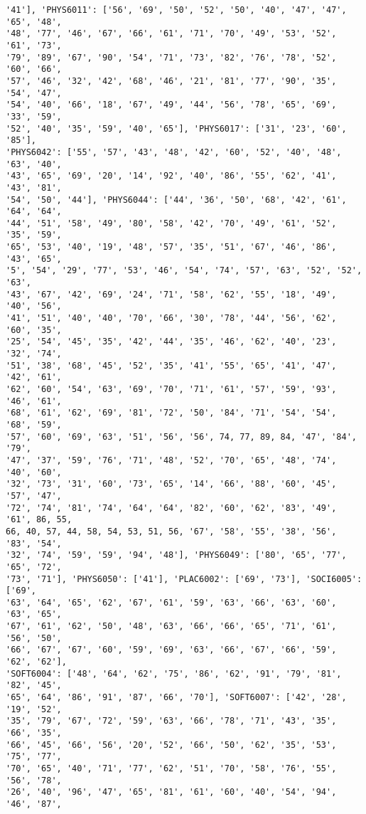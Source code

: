 \documentclass[11pt]{article}
\begin{document}
\begin{Verbatim}[commandchars=\\\{\}]
'41'], 'PHYS6011': ['56', '69', '50', '52', '50', '40', '47', '47', '65', '48',
'48', '77', '46', '67', '66', '61', '71', '70', '49', '53', '52', '61', '73',
'79', '89', '67', '90', '54', '71', '73', '82', '76', '78', '52', '60', '66',
'57', '46', '32', '42', '68', '46', '21', '81', '77', '90', '35', '54', '47',
'54', '40', '66', '18', '67', '49', '44', '56', '78', '65', '69', '33', '59',
'52', '40', '35', '59', '40', '65'], 'PHYS6017': ['31', '23', '60', '85'],
'PHYS6042': ['55', '57', '43', '48', '42', '60', '52', '40', '48', '63', '40',
'43', '65', '69', '20', '14', '92', '40', '86', '55', '62', '41', '43', '81',
'54', '50', '44'], 'PHYS6044': ['44', '36', '50', '68', '42', '61', '64', '64',
'44', '51', '58', '49', '80', '58', '42', '70', '49', '61', '52', '35', '59',
'65', '53', '40', '19', '48', '57', '35', '51', '67', '46', '86', '43', '65',
'5', '54', '29', '77', '53', '46', '54', '74', '57', '63', '52', '52', '63',
'43', '67', '42', '69', '24', '71', '58', '62', '55', '18', '49', '40', '56',
'41', '51', '40', '40', '70', '66', '30', '78', '44', '56', '62', '60', '35',
'25', '54', '45', '35', '42', '44', '35', '46', '62', '40', '23', '32', '74',
'51', '38', '68', '45', '52', '35', '41', '55', '65', '41', '47', '42', '61',
'62', '60', '54', '63', '69', '70', '71', '61', '57', '59', '93', '46', '61',
'68', '61', '62', '69', '81', '72', '50', '84', '71', '54', '54', '68', '59',
'57', '60', '69', '63', '51', '56', '56', 74, 77, 89, 84, '47', '84', '79',
'47', '37', '59', '76', '71', '48', '52', '70', '65', '48', '74', '40', '60',
'32', '73', '31', '60', '73', '65', '14', '66', '88', '60', '45', '57', '47',
'72', '74', '81', '74', '64', '64', '82', '60', '62', '83', '49', '61', 86, 55,
66, 40, 57, 44, 58, 54, 53, 51, 56, '67', '58', '55', '38', '56', '83', '54',
'32', '74', '59', '59', '94', '48'], 'PHYS6049': ['80', '65', '77', '65', '72',
'73', '71'], 'PHYS6050': ['41'], 'PLAC6002': ['69', '73'], 'SOCI6005': ['69',
'63', '64', '65', '62', '67', '61', '59', '63', '66', '63', '60', '63', '65',
'67', '61', '62', '50', '48', '63', '66', '66', '65', '71', '61', '56', '50',
'66', '67', '67', '60', '59', '69', '63', '66', '67', '66', '59', '62', '62'],
'SOFT6004': ['48', '64', '62', '75', '86', '62', '91', '79', '81', '82', '45',
'65', '64', '86', '91', '87', '66', '70'], 'SOFT6007': ['42', '28', '19', '52',
'35', '79', '67', '72', '59', '63', '66', '78', '71', '43', '35', '66', '35',
'66', '45', '66', '56', '20', '52', '66', '50', '62', '35', '53', '75', '77',
'70', '65', '40', '71', '77', '62', '51', '70', '58', '76', '55', '56', '78',
'26', '40', '96', '47', '65', '81', '61', '60', '40', '54', '94', '46', '87',

\end{Verbatim}
\end{document}
